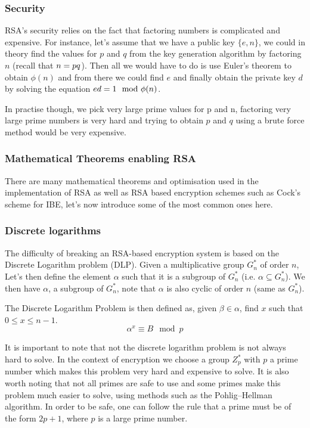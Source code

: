 \documentclass[conference]{IEEEtran}
\begin{document}
\subsubsection{Security}
RSA's security relies on the fact that factoring numbers is complicated and expensive.
For instance, let's assume that we have a public key $\{e,n\}$, we could in theory find
the values for $p$ and $q$ from the key generation algorithm by factoring $n$ (recall that $n = p\*q$). Then all we would have to do is 
use Euler's theorem to obtain $\phi(n)$ and from there we could find $e$ and finally 
obtain the private key $d$ by solving the equation $e\*d = 1\mod \phi(n)$.

In practise though, we pick very large prime values for p and n, factoring very large prime
numbers is very hard and trying to obtain $p$ and $q$ using a brute force method
would be very expensive.


\subsubsection{Mathematical Theorems enabling RSA}
There are many mathematical theorems and optimisation
used in the implementation of RSA as well as RSA based encryption schemes such as 
Cock's scheme for IBE, let's now introduce some of the most common ones here.


\subsubsection*{Discrete logarithms}
The difficulty of breaking an RSA-based encryption system is based on the 
Discrete Logarithm problem (DLP). 
Given a multiplicative group $G_{n}^{*}$ of order $n$,
Let's then define the element $\alpha$ such that it is a subgroup of $G_{n}^{*}$ 
(i.e. $\alpha \subseteq G_{n}^{*}$). We then have $\alpha$, a subgroup of $G_{n}^{*}$,
note that $\alpha$ is also cyclic of order $n$ (same as $G_{n}^{*}$).


The Discrete Logarithm Problem is then defined as, given $\beta \in \alpha$,
find $x$ such that $0 \leq x \leq n - 1$.
\begin{equation}
    \alpha^{x} \equiv B\mod p
\end{equation}

It is important to note that not the discrete logarithm problem
is not always hard to solve. In the context of encryption we choose a group
$Z_{p}^*$ with $p$ a prime number which makes this problem very hard and 
expensive to solve.
It is also worth noting that not all primes are safe to use and some primes
make this problem much easier to solve, using methods such as the 
Pohlig–Hellman algorithm. In order to be safe, one can follow the rule
that a prime must be of the form $2p + 1$, where $p$ is a large prime number. 
\end{document}
